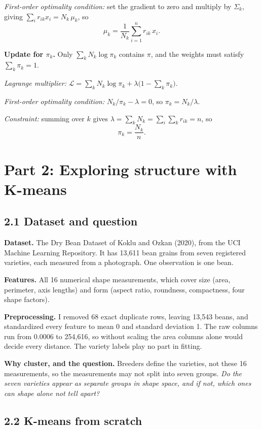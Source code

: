 \documentclass[11pt]{article}
\begin{document}
\emph{First-order optimality condition:} set the gradient to zero and multiply by
$\Sigma_k$, giving $\sum_i r_{ik}x_i=N_k\,\mu_k$, so
\[
\mu_k=\frac{1}{N_k}\sum_{i=1}^{n}r_{ik}\,x_i .
\]

\textbf{Update for $\pi_k$.} Only $\sum_k N_k\log\pi_k$ contains $\pi$, and the weights
must satisfy $\sum_k\pi_k=1$.

\emph{Lagrange multiplier:}
$\mathcal{L}=\sum_k N_k\log\pi_k+\lambda\bigl(1-\sum_k\pi_k\bigr)$.

\emph{First-order optimality condition:} $N_k/\pi_k-\lambda=0$, so $\pi_k=N_k/\lambda$.

\emph{Constraint:} summing over $k$ gives $\lambda=\sum_k N_k=\sum_i\sum_k r_{ik}=n$, so
\[
\pi_k=\frac{N_k}{n}.
\]

\section*{Part 2: Exploring structure with K-means}

\subsection*{2.1 Dataset and question}

\textbf{Dataset.} The Dry Bean Dataset of Koklu and Ozkan (2020), from the UCI Machine
Learning Repository. It has 13{,}611 bean grains from seven registered varieties, each
measured from a photograph. One observation is one bean.

\textbf{Features.} All 16 numerical shape measurements, which cover size (area, perimeter,
axis lengths) and form (aspect ratio, roundness, compactness, four shape factors).

\textbf{Preprocessing.} I removed 68 exact duplicate rows, leaving 13{,}543 beans, and
standardized every feature to mean 0 and standard deviation 1. The raw columns run from
0.0006 to 254{,}616, so without scaling the area columns alone would decide every
distance. The variety labels play no part in fitting.

\textbf{Why cluster, and the question.} Breeders define the varieties, not these 16
measurements, so the measurements may not split into seven groups. \emph{Do the seven
varieties appear as separate groups in shape space, and if not, which ones can shape
alone not tell apart?}

\subsection*{2.2 K-means from scratch}
\end{document}
